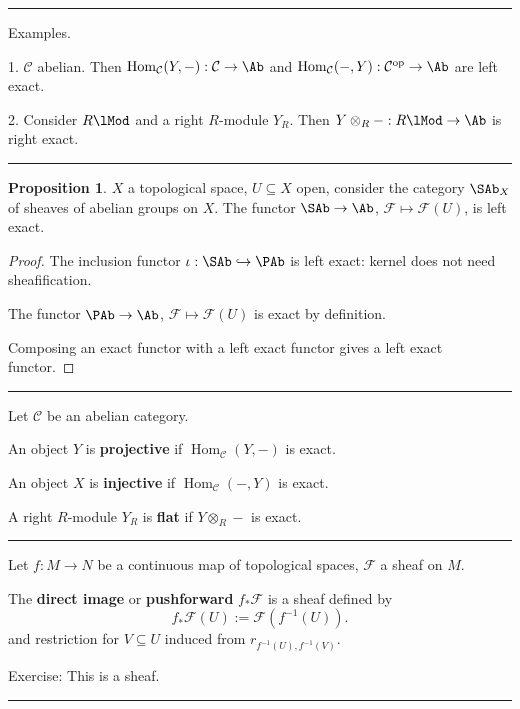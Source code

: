 \documentclass[12pt]{article}
\newcommand{\keyword}[1]{\textbf{#1}}
\newcommand{\sepline}{\rule{\textwidth}{0.4pt}}
\theoremstyle{definition}
\newtheorem{proposition}{Proposition}
\newcommand{\CC}{\mathcal{C}}
\newcommand{\FF}{\mathcal{F}}
\newcommand{\<}{\left\langle}
\renewcommand{\>}{\right\rangle}
\newcommand{\seq}{\subseteq}
\newcommand{\tensor}{\otimes}
\newcommand{\inc}{\hookrightarrow}
\DeclareMathOperator{\Hom}{Hom}
\newcommand{\op}{\mathrm{op}}
\renewcommand{\_}[1]{{_{#1}}}
\begin{document}
\sepline

Examples.

1. $\CC$ abelian.
Then $\Hom_\CC(Y, -) : \CC \to \Ab$ and $\Hom_\CC(-, Y) : \CC^\op \to \Ab$ are left exact.

2. Consider $R\lMod$ and a right $R$-module $Y_R$.
Then $Y \tensor_R - : R\lMod \to \Ab$ is right exact.

\sepline

\begin{proposition}
    $X$ a topological space, $U \seq X$ open, consider the category $\SAb_X$ of sheaves of abelian groups on $X$.
    The functor $\SAb \to \Ab$, $\FF \mapsto \FF(U)$, is left exact.
\end{proposition}

\begin{proof}
    The inclusion functor $\iota : \SAb \inc \PAb$ is left exact: kernel does not need sheafification.

    The functor $\PAb \to \Ab$, $\FF \mapsto \FF(U)$ is exact by definition.

    Composing an exact functor with a left exact functor gives a left exact functor.
\end{proof}

\sepline

Let $\CC$ be an abelian category.

An object $Y$ is \keyword{projective} if $\Hom_\CC(Y, -)$ is exact.

An object $X$ is \keyword{injective} if $\Hom_\CC(-, Y)$ is exact.

A right $R$-module $Y_R$ is \keyword{flat} if $Y \tensor_R -$ is exact.

\sepline

Let $f : M \to N$ be a continuous map of topological spaces, $\FF$ a sheaf on $M$.

The \keyword{direct image} or \keyword{pushforward} $f_*\FF$ is a sheaf defined by
\[
    f_*\FF(U) := \FF(f^{-1}(U)).
\]
and restriction for $V \seq U$ induced from $r_{f^{-1}(U), f^{-1}(V)}$.

Exercise: This is a sheaf.

\sepline
\end{document}
